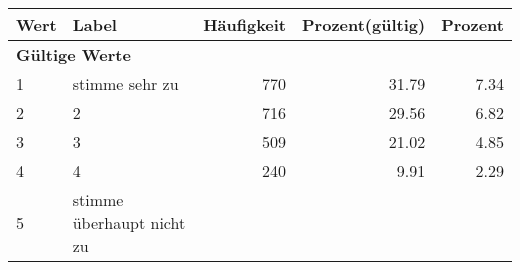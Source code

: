      \begin{longtable}{lXrrr}
     \toprule
     \textbf{Wert} & \textbf{Label} & \textbf{Häufigkeit} & \textbf{Prozent(gültig)} & \textbf{Prozent} \\
     \endhead
     \midrule
     \multicolumn{5}{l}{\textbf{Gültige Werte}}\\

     1 &
     \multicolumn{1}{X}{ stimme sehr zu   } &


       \num{770} &
       \num[round-mode=places,round-precision=2]{31.79} &
         \num[round-mode=places,round-precision=2]{7.34} \\

     2 &
     \multicolumn{1}{X}{ 2   } &


       \num{716} &
       \num[round-mode=places,round-precision=2]{29.56} &
         \num[round-mode=places,round-precision=2]{6.82} \\

     3 &
     \multicolumn{1}{X}{ 3   } &


       \num{509} &
       \num[round-mode=places,round-precision=2]{21.02} &
         \num[round-mode=places,round-precision=2]{4.85} \\

     4 &
     \multicolumn{1}{X}{ 4   } &


       \num{240} &
       \num[round-mode=places,round-precision=2]{9.91} &
         \num[round-mode=places,round-precision=2]{2.29} \\

     5 &
     \multicolumn{1}{X}{ stimme überhaupt nicht zu   } &



\end{longtable}

